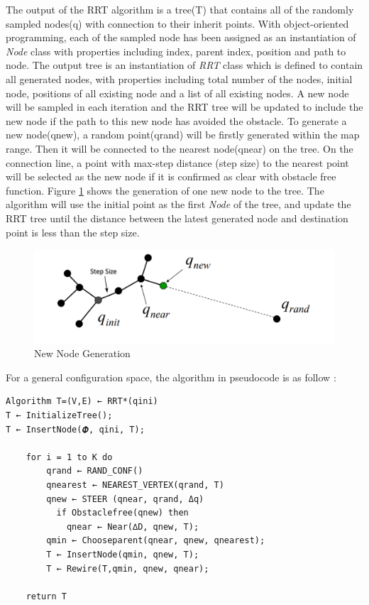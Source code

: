 \documentclass[
  oneside]{ubcthesis}
\begin{document}
The output of the RRT algorithm is a tree(T) that contains all of the randomly sampled nodes(q) with connection to their inherit points. With object-oriented programming, each of the sampled node has been assigned as an instantiation of \emph{Node} class with properties including index, parent index, position and path to node. The output tree is an instantiation of \emph{RRT} class which is defined to contain all generated nodes, with properties including total number of the nodes, initial node, positions of all existing node and a list of all existing nodes. A new node will be sampled in each iteration and the RRT tree will be updated to include the new node if the path to this new node has avoided the obstacle. To generate a new node(qnew), a random point(qrand) will be firstly generated within the map range. Then it will be connected to the nearest node(qnear) on the tree. On the connection line, a point with max-step distance (step size) to the nearest point will be selected as the new node if it is confirmed as clear with obstacle free function. Figure \ref{fig:figure1} shows the generation of one new node to the tree. The algorithm will use the initial point as the first \emph{Node} of the tree, and update the RRT tree until the distance between the latest generated node and destination point is less than the step size.

\begin{figure}

{\centering \includegraphics[width=0.6\linewidth]{figures/1} 

}

\caption{New Node Generation\citep{choset2015robotic}}\label{fig:figure1}
\end{figure}



For a general configuration space, the algorithm in pseudocode is as follow \citep{rrtCompare}:

\begin{verbatim}
Algorithm T=(V,E) ← RRT*(qini)
T ← InitializeTree();
T ← InsertNode(𝜱, qini, T);

    for i = 1 to K do
        qrand ← RAND_CONF()
        qnearest ← NEAREST_VERTEX(qrand, T)
        qnew ← STEER (qnear, qrand, Δq)
          if Obstaclefree(qnew) then
            qnear ← Near(∆D, qnew, T);
        qmin ← Chooseparent(qnear, qnew, qnearest);
        T ← InsertNode(qmin, qnew, T);
        T ← Rewire(T,qmin, qnew, qnear);
      
    return T
\end{verbatim}
\end{document}
